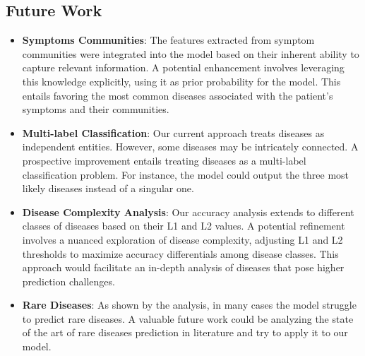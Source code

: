 \subsection{Future Work}

\begin{itemize}
\item \textbf{Symptoms Communities}: The features extracted from symptom communities were integrated into the model based on their 
inherent ability to capture relevant information. A potential enhancement involves leveraging this knowledge explicitly, using it as prior 
probability for the model. This entails favoring the most common diseases associated with the patient's symptoms and their communities.

\item \textbf{Multi-label Classification}: Our current approach treats diseases as independent entities. However, some diseases 
may be intricately connected. A prospective improvement entails treating diseases as a multi-label classification problem. 
For instance, the model could output the three most likely diseases instead of a singular one.

\item \textbf{Disease Complexity Analysis}: Our accuracy analysis extends to different classes of diseases based on their L1 and L2 values. 
A potential refinement involves a nuanced exploration of disease complexity, adjusting L1 and L2 thresholds to maximize accuracy 
differentials among disease classes. This approach would facilitate an in-depth analysis of diseases that pose higher prediction challenges.

\item \textbf{Rare Diseases}: As shown by the analysis, in many cases the model struggle to predict rare diseases. A valuable future
work could be analyzing the state of the art of rare diseases prediction in literature and try to apply it to our model.

\end{itemize}
